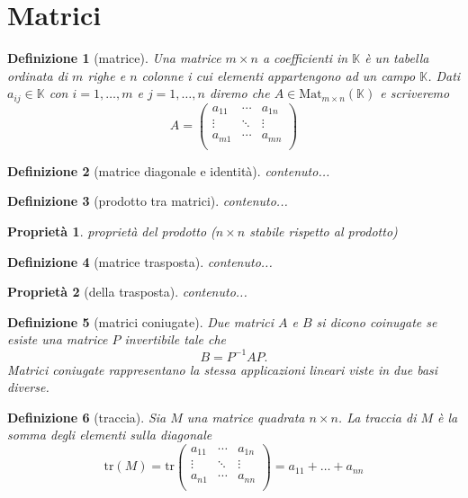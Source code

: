 \documentclass[9pt, a4paper]{article}
\newcommand{\K}{\mathbb{K}}
\newcommand{\tr}{\mathrm{tr}}
\theoremstyle{mythm}
\newtheorem{definition}{Definizione}[section]
\newtheorem{propriety}{Proprietà}[section]
\begin{document}
\section{Matrici}

\begin{definition}[matrice]
	Una matrice $ m \times n $ a coefficienti in $ \K $ è un tabella ordinata di $ m $ righe e $ n $ colonne i cui elementi appartengono ad un campo $ \K $. Dati $ a_{ij} \in \K $ con $ i = 1, \ldots, m $ e $ j = 1, \ldots, n $ diremo che $ A \in \mathrm{Mat}_{m \times n} (\K) $ e scriveremo
	\[ A = 
	\begin{pmatrix}
		a_{11} & \cdots  & a_{1n} \\
		\vdots & \ddots & \vdots \\
		a_{m1} & \cdots  & a_{mn} \\
	\end{pmatrix}\]
\end{definition}

\begin{definition}[matrice diagonale e identità]
	contenuto...
\end{definition}

\begin{definition}[prodotto tra matrici]
	contenuto...
\end{definition}

\begin{propriety}
	\textsf{proprietà del prodotto ($ n \times n $ stabile rispetto al prodotto)}
\end{propriety}

\begin{definition}[matrice trasposta]
	contenuto...
\end{definition}

\begin{propriety}[della trasposta]
	contenuto...
\end{propriety}

\begin{definition}[matrici coniugate]
	Due matrici $ A $ e $ B $ si dicono coinugate se esiste una matrice $ P $ invertibile tale che \[B = P^{-1} A P.\] Matrici coniugate rappresentano la stessa applicazioni lineari viste in due basi diverse. 
\end{definition}

\begin{definition}[traccia]
	Sia $ M $ una matrice quadrata $ n \times n $. La traccia di $ M $ è la somma degli elementi sulla diagonale \[ \tr(M) = \tr 
	\begin{pmatrix}
	a_{11} & \cdots  & a_{1n} \\
	\vdots & \ddots & \vdots \\
	a_{n1} & \cdots  & a_{nn} \\
	\end{pmatrix}
	= a_{11} + \ldots + a_{nn}\]
\end{definition}
\end{document}
